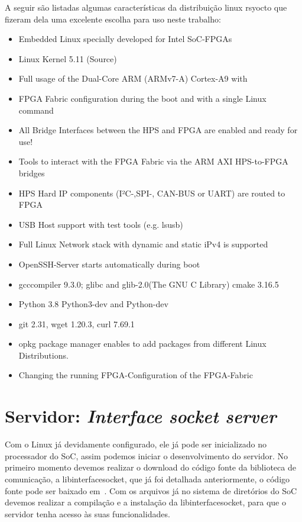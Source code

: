 A seguir são listadas algumas características da distribuição linux rsyocto que fizeram dela uma excelente escolha para uso neste trabalho:
\begin{itemize}
	\item Embedded Linux specially developed for Intel SoC-FPGAs
	\item Linux Kernel 5.11 (Source)
	\item Full usage of the Dual-Core ARM (ARMv7-A) Cortex-A9 with
	\item FPGA Fabric configuration during the boot and with a single Linux command
	\item All Bridge Interfaces between the HPS and FPGA are enabled and ready for use!
	\item Tools to interact with the FPGA Fabric via the ARM AXI HPS-to-FPGA bridges
	\item HPS Hard IP components (I²C-,SPI-, CAN-BUS or UART) are routed to FPGA 
	\item USB Host support with test tools (e.g. lsusb)
	\item Full Linux Network stack with dynamic and static iPv4 is supported
	\item OpenSSH-Server starts automatically during boot
	\item gcccompiler 9.3.0; glibc and glib-2.0(The GNU C Library) cmake 3.16.5
	\item Python 3.8 Python3-dev and Python-dev
	\item git 2.31, wget 1.20.3, curl 7.69.1
	\item opkg package manager enables to add packages from different Linux Distributions.
	\item Changing the running FPGA-Configuration of the FPGA-Fabric
	\end{itemize}

\section{Servidor: \textit{Interface socket server}}
Com o Linux já devidamente configurado, ele já pode ser inicializado no processador do SoC, assim podemos iniciar o desenvolvimento do servidor. No primeiro momento devemos realizar o download do código fonte da biblioteca de comunicação, a libinterfacesocket, que já foi detalhada anteriormente, o código fonte pode ser baixado em~\cite{interface-socket-server}. Com os arquivos já no sistema de diretórios do SoC devemos realizar a compilação e a instalação da libinterfacesocket, para que o servidor tenha acesso às suas funcionalidades. 

